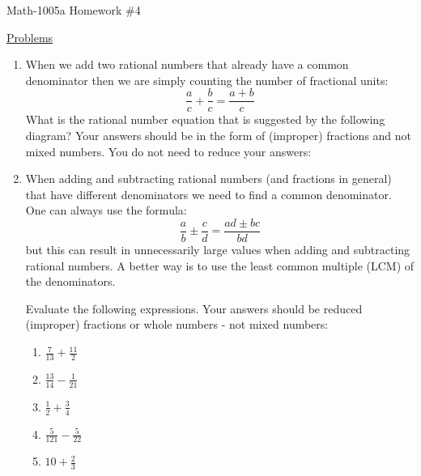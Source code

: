 \documentclass[letterpaper,12pt,fleqn]{article}
\begin{document}
\begin{center}
\Large Math-1005a Homework \#4
\end{center}

\vspace{0.5in}

\underline{Problems}

\begin{enumerate}
\item When we add two rational numbers that already have a common denominator
  then we are simply counting the number of fractional units:
  \[\frac{a}{c}+\frac{b}{c}=\frac{a+b}{c}\]
  What is the rational number equation that is suggested by the following
  diagram? Your answers should be in the form of (improper) fractions and not
  mixed numbers. You do not need to reduce your answers:

  \bigskip

  \begin{figure}[h]
    \centering
  \end{figure}

\item When adding and subtracting rational numbers (and fractions in general)
  that have different denominators we need to find a common denominator. One
  can always use the formula:
  \[\frac{a}{b}\pm\frac{c}{d}=\frac{ad\pm bc}{bd}\]
  but this can result in unnecessarily large values when adding and subtracting
  rational numbers. A better way is to use the least common multiple (LCM) of
  the denominators.

  Evaluate the following expressions. Your answers should be reduced (improper)
  fractions or whole numbers - not mixed numbers:
  \begin{enumerate}
  \item $\frac{7}{13}+\frac{11}{2}$
  \item $\frac{13}{14}-\frac{1}{21}$
  \item $\frac{1}{2}+\frac{3}{4}$
  \item $\frac{5}{121}-\frac{5}{22}$
  \item $10+\frac{2}{3}$
  \end{enumerate}


\end{enumerate}
\end{document}
